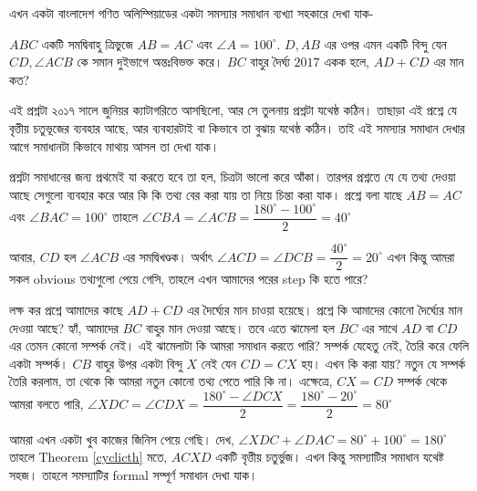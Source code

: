 \documentclass[a4paper,11pt]{article}
\newcommand{\drg}{^{\circ}}
\begin{document}
এখন একটা বাংলাদেশ গণিত অলিম্পিয়াডের একটা সমস্যার সমাধান ব্যখ্যা সহকারে দেখা যাক- 
\begin{xmpl}
	$ABC$ একটি সমদ্বিবাহু ত্রিভুজে $AB=AC$ এবং $\angle A=100\drg$. $D,AB$ এর ওপর এমন একটি বিন্দু যেন $CD, \angle ACB$ কে সমান দুইভাগে অন্তঃবিভক্ত করে। $BC$ বাহুর দৈর্ঘ্য $2017$ একক হলে, $AD+CD$ এর মান কত?
\end{xmpl}
এই প্রশ্নটা ২০১৭ সালে জুনিয়র ক্যাটাগরিতে আসছিলো, আর সে তুলনায় প্রশ্নটা যথেষ্ঠ কঠিন। তাছাড়া এই প্রশ্নে যে বৃত্তীয় চতুভূজের ব্যবহার আছে, আর ব্যবহারটাই বা কিভাবে তা বুঝায় যথেষ্ঠ কঠিন। তাই এই সমস্যার সমাধান দেখার আগে সমাধানটা কিভাবে মাথায় আসল তা দেখা যাক। 

প্রশ্নটা সমাধানের জন্য প্রথমেই যা করতে হবে তা হল, চিত্রটা ভালো করে আঁকা। তারপর প্রশ্নতে যে যে তথ্য দেওয়া আছে সেগুলো ব্যবহার করে আর কি কি তথ্য বের করা যায় তা নিয়ে চিন্তা করা যাক। প্রশ্নে বলা যাছে $AB=AC$ এবং $\angle BAC=100\drg$ তাহলে $\angle CBA=\angle ACB=\dfrac{180\drg -100\drg}{2}=40\drg$

আবার, $CD$ হল $\angle ACB$ এর সমদ্বিখণ্ডক। অর্থাৎ $\angle ACD=\angle DCB=\dfrac{40\drg}{2}=20\drg$ এখন কিন্তু আমরা সকল obvious তথ্যগুলো পেয়ে গেসি, তাহলে এখন আমাদের পরের step কি হতে পারে? 

লক্ষ কর প্রশ্নে আমাদের কাছে $AD+CD$ এর দৈর্ঘ্যের মান চাওয়া হয়েছে। প্রশ্নে কি আমাদের কোনো দৈর্ঘ্যের মান দেওয়া আছে? হ্যাঁ, আমাদের $BC$ বাহুর মান দেওয়া আছে। তবে এতে ঝামেলা হল $BC$ এর সাথে $AD$ বা $CD$ এর তেমন কোনো সম্পর্ক নেই। এই ঝামেলাটা কি আমরা সমাধান করতে পারি? সম্পর্ক যেহেতু নেই, তৈরি করে ফেলি একটা সম্পর্ক। $CB$ বাহুর উপর একটা বিন্দু $X$ নেই যেন $CD=CX$ হয়। এখন কি করা যায়? নতুন যে সম্পর্ক তৈরি করলাম, তা থেকে কি আমরা নতুন কোনো তথ্য পেতে পারি কি না। এক্ষেত্রে, $CX=CD$ সম্পর্ক থেকে আমরা বলতে পারি, $\angle XDC=\angle CDX=\dfrac{180\drg-\angle DCX}{2}=\dfrac{180\drg-20\drg}{2}=80\drg$

আমরা এখন একটা খুব কাজের জিনিস পেয়ে গেছি। দেখ, $\angle XDC+\angle DAC=80\drg+100\drg=180\drg$ তাহলে Theorem \ref{cyclicth} মতে, $ACXD$ একটি বৃত্তীয় চতুর্ভুজ। এখন কিন্তু সমস্যাটির সমাধান যথেষ্ট সহজ। তাহলে সমস্যাটির formal সম্পূর্ণ সমাধান দেখা যাক। 
\end{document}
